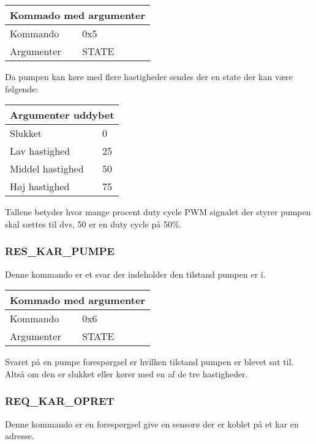 \begin{table}[H]
\setlength{\parindent}{12pt}
\begin{tabular}{|l|lcc|}
\hline
\multicolumn{4}{|c|}{Kommado med argumenter}\\\hline
Kommando & 0x5 & & \\
Argumenter & STATE & & \\\hline
\end{tabular}
\end{table}

Da pumpen kan køre med flere hastigheder sendes der en state der kan være følgende:

\begin{table}[H]
\setlength{\parindent}{12pt}
\begin{tabular}{|l|l|}
\hline
\multicolumn{2}{|c|}{Argumenter uddybet}\\\hline
Slukket & 0 \\
Lav hastighed & 25 \\
Middel hastighed & 50 \\
Høj hastighed & 75 \\\hline
\end{tabular}
\end{table}

Tallene betyder hvor mange procent duty cycle PWM signalet der styrer pumpen skal sættes til dvs, 50 er en duty cycle på 50\%.

\subsubsection{RES\_KAR\_PUMPE}
Denne kommando er et svar der indeholder den tilstand pumpen er i.

\begin{table}[H]
\setlength{\parindent}{12pt}
\begin{tabular}{|l|lcc|}
\hline
\multicolumn{4}{|c|}{Kommado med argumenter}\\\hline
Kommando & 0x6 & & \\
Argumenter & STATE & & \\\hline
\end{tabular}
\end{table}


Svaret på en pumpe forespørgsel er hvilken tilstand pumpen er blevet sat til. Altså om den er slukket eller kører med en af de tre hastigheder.


\subsubsection{REQ\_KAR\_OPRET}
Denne kommando er en forespørgsel give en sensorø der er koblet på et kar en adresse.

